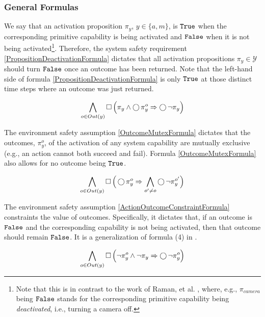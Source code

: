 \subsubsection{General Formulas}

We say that an activation proposition $\pi_y$, $y \in \{a, m\}$, is $\mathtt{True}$ when the corresponding primitive capability is being activated and $\mathtt{False}$ when it is not being activated\footnote{Note that this is in contrast to the work of Raman, et al. \cite{Vasu2013ICRA}, where, e.g., $\pi_{camera}$ being $\mathtt{False}$ stands for the corresponding primitive capability being \emph{deactivated}, i.e., turning a camera off.}.
Therefore, the system safety requirement \eqref{PropositionDeactivationFormula} dictates that all activation propositions $\pi_y \in \mathcal{Y}$ should turn $\mathtt{False}$ once an outcome has been returned.
Note that the left-hand side of formula \eqref{PropositionDeactivationFormula} is only $\mathtt{True}$ at those distinct time steps where an outcome was just returned.

\begin{equation}\label{PropositionDeactivationFormula}
	\bigwedge \limits_{o \in Out(y)} \operatorname{\Box} \Big( \pi_y \wedge \operatorname{\bigcirc} \pi_y^o \Rightarrow \operatorname{\bigcirc} \lnot \pi_y \Big)
\end{equation}

The environment safety assumption \eqref{OutcomeMutexFormula} dictates that the outcomes, $\pi_y^o$, of the activation of any system capability are mutually exclusive (e.g., an action cannot both succeed and fail).
Formula \eqref{OutcomeMutexFormula} also allows for no outcome being $\mathtt{True}$.

\begin{equation}\label{OutcomeMutexFormula}
	\bigwedge \limits_{o \in Out(y)} \operatorname{\Box} \Big( \operatorname{\bigcirc} \pi_y^o \Rightarrow \bigwedge \limits_{o^\prime \neq o} \operatorname{\bigcirc} \lnot \pi_y^{o^\prime} \Big)
\end{equation}

The environment safety assumption \eqref{ActionOutcomeConstraintFormula} constraints the value of outcomes.
Specifically, it dictates that, if an outcome is $\mathtt{False}$ and the corresponding capability is not being activated, then that outcome should remain $\mathtt{False}$.
It is a generalization of formula (4) in \cite{Vasu2013ICRA}.

\begin{equation}\label{ActionOutcomeConstraintFormula}
	\bigwedge \limits_{o \in Out(y)} \operatorname{\Box} \Big( \lnot \pi_y^o \wedge \lnot \pi_y \Rightarrow \operatorname{\bigcirc} \lnot \pi_y^o \Big)
\end{equation}

